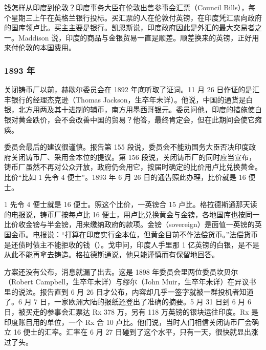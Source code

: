 钱怎样从印度到伦敦？印度事务大臣在伦敦出售参事会汇票（Council Bills），每个星期三上午在英格兰银行投标\cite{keynes1913}。买汇票的人在伦敦付英镑，在印度凭汇票向政府的国库领卢比。买主主要是银行\cite{keynes1913}。凯恩斯说，印度政府因此是外汇的最大交易者之一\cite{keynes1913}。Maddison 说，印度的商品与金银贸易一直是顺差\cite{maddison1971}。顺差换来的英镑，正好用来付伦敦的本国费用。

\subsubsection{1893 年}
关闭铸币厂以前，赫歇尔委员会在 1892 年底听取了证词。11 月 26 日作证的是汇丰银行的经理杰克逊（Thomas Jackson，生卒年未详）\cite{herschell1893}。他说，中国的通货是白银，北方用两及其十进制的辅币，南方用墨西哥银元\cite{herschell1893}。委员问他，印度的措施使白银对黄金跌价，会不会改善中国的贸易？他答，最终肯定会，但在此期间会使它瘫痪\cite{herschell1893}。

委员会最后的建议很谨慎。报告第 155 段说，委员会不能劝国务大臣否决印度政府关闭铸币厂、采用金本位的提议\cite{herschell1893}。第 156 段说，关闭铸币厂的同时应当宣布，铸币厂虽然不再对公众开放，政府仍会用它，按届时确定的比价用卢比兑换黄金\cite{herschell1893}。比价“比如 1 先令 4 便士”\cite{herschell1893}。1893 年 6 月 26 日的通告照此办理，比价就是 16 便士\cite{fowler1899}。

1 先令 4 便士就是 16 便士。照这个比价，一英镑合 15 卢比。格拉德斯通那天读的电报说，铸币厂按每卢比 16 便士，用卢比兑换黄金与金镑，各地国库也按同一比价收金镑与半金镑，用来缴纳政府的款项\cite{hansard1893}。金镑（sovereign）是面值一英镑的英国金币。电报说：“打算在印度实行金本位，但黄金目前不作法偿货币。”\cite{hansard1893}法偿货币是还债时债主不能拒收的钱（）。戈申问，印度人手里那 1 亿英镑的白银，是不是从此不能再拿去铸造\cite{hansard1893}。格拉德斯通说，他只能谨慎而有保留地回答\cite{hansard1893}。

方案还没有公布，消息就漏了出去。这是 1898 年委员会里两位委员坎贝尔（Robert Campbell，生卒年未详）与缪尔（John Muir，生卒年未详）在异议书里的说法\cite{fowler1899}。报告直到 6 月 26 日才公布，内容却几乎一签字就被一群投机者知道了\cite{fowler1899}。6 月 7 日，一家欧洲大陆的报纸还登出了准确的摘要\cite{fowler1899}。5 月 31 日到 6 月 6 日，被买走的参事会汇票达 Rx 378 万，另有 118 万英镑的银块运往印度\cite{fowler1899}。Rx 是印度账目用的单位，一个 Rx 合 10 卢比。他们说，当时人们相信关闭铸币厂会确立 16 便士的汇率\cite{fowler1899}。汇率在 6 月 27 日碰到了这个水平，只有一天，很快就显出涨过了头\cite{fowler1899}。

